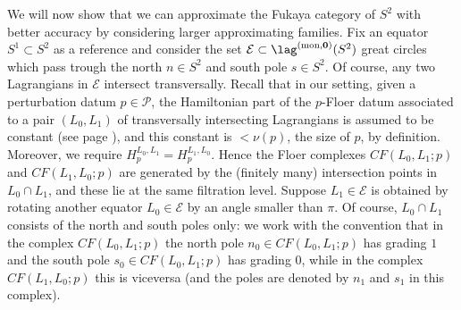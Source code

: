 We will now show that we can approximate the Fukaya category of $S^2$ with better accuracy by considering larger approximating families. Fix an equator $S^1\subset S^2$ as a reference and consider the set $\mathcal{E}\subset \lag^{\text{(mon,} \mathbf{0} \text{)}}(S^2)$ great circles which pass trough the north $n\in S^2$ and south pole $s\in S^2$. %
Of course, any two Lagrangians in $\mathcal{E}$ intersect transversally. Recall that in our setting, given a perturbation datum $p\in \mathcal{P}$, the Hamiltonian part of the $p$-Floer datum associated to a pair $(L_0,L_1)$ of transversally intersecting Lagrangians is assumed to be constant (see page \pageref{gio:FD}), and this constant is $<\nu(p)$, the size of $p$, by definition. Moreover, we require $H^{L_0,L_1}_p=H^{L_1,L_0}_p$. Hence the Floer complexes $CF(L_0,L_1;p)$ and $CF(L_1,L_0;p)$ are generated by the (finitely many) intersection points in $L_0\cap L_1$, and these lie at the same filtration level. Suppose $L_1\in \mathcal{E}$ is obtained by rotating another equator $L_0\in \mathcal{E}$ by an angle smaller than $\pi$. Of course, $L_0\cap L_1$ consists of the north and south poles only: we work with the convention that in the complex $CF(L_0,L_1;p)$ the north pole $n_{0}\in CF(L_0,L_1;p)$ has grading $1$ and the south pole $s_{0}\in CF(L_0,L_1;p)$ has grading $0$, while in the complex $CF(L_1,L_0;p)$ this is viceversa (and the poles are denoted by $n_{1}$ and $s_{1}$ in this complex).

